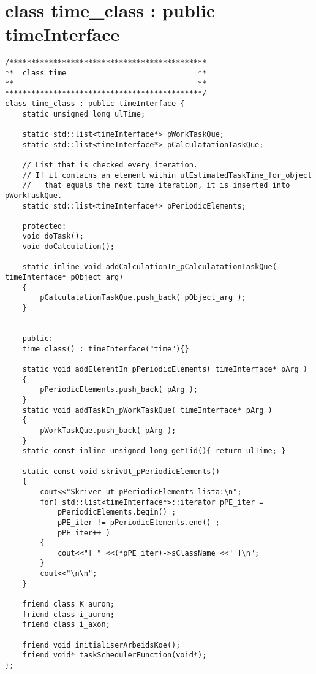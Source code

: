 \chapter{class time\_class : public timeInterface} %
\label{appendixTimeClass}
\begin{lstlisting}
/*********************************************
** 	class time  							**
** 		 									**
*********************************************/
class time_class : public timeInterface {
	static unsigned long ulTime;
	
	static std::list<timeInterface*> pWorkTaskQue;
	static std::list<timeInterface*> pCalculatationTaskQue;

	// List that is checked every iteration.
	// If it contains an element within ulEstimatedTaskTime_for_object
	//   that equals the next time iteration, it is inserted into pWorkTaskQue.
	static std::list<timeInterface*> pPeriodicElements;

	protected:
	void doTask();
	void doCalculation();

	static inline void addCalculationIn_pCalculatationTaskQue( timeInterface* pObject_arg)
	{
	 	pCalculatationTaskQue.push_back( pObject_arg );
	}


	public:
	time_class() : timeInterface("time"){}

	static void addElementIn_pPeriodicElements( timeInterface* pArg )
	{
		pPeriodicElements.push_back( pArg );
	}
	static void addTaskIn_pWorkTaskQue( timeInterface* pArg )
	{
	 	pWorkTaskQue.push_back( pArg );
	}
	static const inline unsigned long getTid(){ return ulTime; }
	
	static const void skrivUt_pPeriodicElements()
	{
		cout<<"Skriver ut pPeriodicElements-lista:\n";
		for( std::list<timeInterface*>::iterator pPE_iter = 
			pPeriodicElements.begin() ;
			pPE_iter != pPeriodicElements.end() ;
			pPE_iter++ )
		{
			cout<<"[ " <<(*pPE_iter)->sClassName <<" ]\n";
		}
		cout<<"\n\n";
	}

	friend class K_auron;
	friend class i_auron;
	friend class i_axon; 

	friend void initialiserArbeidsKoe();
	friend void* taskSchedulerFunction(void*);
};

\end{lstlisting}














